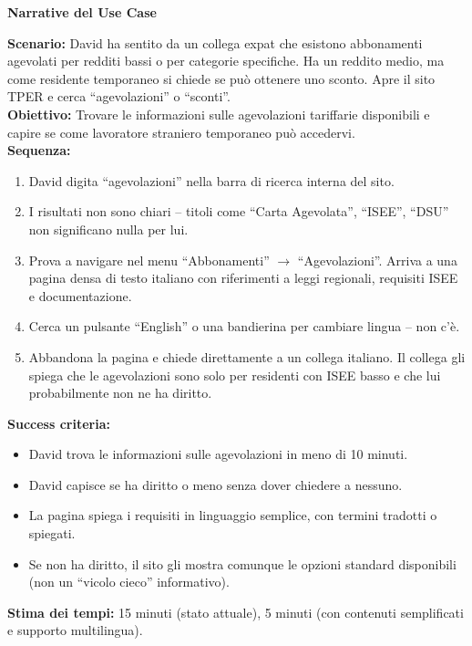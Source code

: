\documentclass[11pt,a4paper]{article}
\begin{document}
\vspace{0.3cm}

\begin{tcolorbox}[colback=backgroundColor,colframe=borderColor,arc=2mm]
    \textbf{Narrative del Use Case} \\[4pt]
    {\small
    \textbf{Scenario:} David ha sentito da un collega expat che esistono abbonamenti agevolati per redditi bassi o per categorie specifiche. Ha un reddito medio, ma come residente temporaneo si chiede se pu\`o ottenere uno sconto. Apre il sito TPER e cerca ``agevolazioni'' o ``sconti''. \\[4pt]

    \textbf{Obiettivo:} Trovare le informazioni sulle agevolazioni tariffarie disponibili e capire se come lavoratore straniero temporaneo pu\`o accedervi. \\[4pt]

    \textbf{Sequenza:}
    \begin{enumerate}
        \item David digita ``agevolazioni'' nella barra di ricerca interna del sito.
        \item I risultati non sono chiari -- titoli come ``Carta Agevolata'', ``ISEE'', ``DSU'' non significano nulla per lui.
        \item Prova a navigare nel menu ``Abbonamenti'' $\rightarrow$ ``Agevolazioni''. Arriva a una pagina densa di testo italiano con riferimenti a leggi regionali, requisiti ISEE e documentazione.
        \item Cerca un pulsante ``English'' o una bandierina per cambiare lingua -- non c'\`e.
        \item Abbandona la pagina e chiede direttamente a un collega italiano. Il collega gli spiega che le agevolazioni sono solo per residenti con ISEE basso e che lui probabilmente non ne ha diritto.
    \end{enumerate}

    \textbf{Success criteria:}
    \begin{itemize}
        \item David trova le informazioni sulle agevolazioni in meno di 10 minuti.
        \item David capisce se ha diritto o meno senza dover chiedere a nessuno.
        \item La pagina spiega i requisiti in linguaggio semplice, con termini tradotti o spiegati.
        \item Se non ha diritto, il sito gli mostra comunque le opzioni standard disponibili (non un ``vicolo cieco'' informativo).
    \end{itemize}

    \textbf{Stima dei tempi:} 15 minuti (stato attuale), 5 minuti (con contenuti semplificati e supporto multilingua).
    }
\end{tcolorbox}
\end{document}

